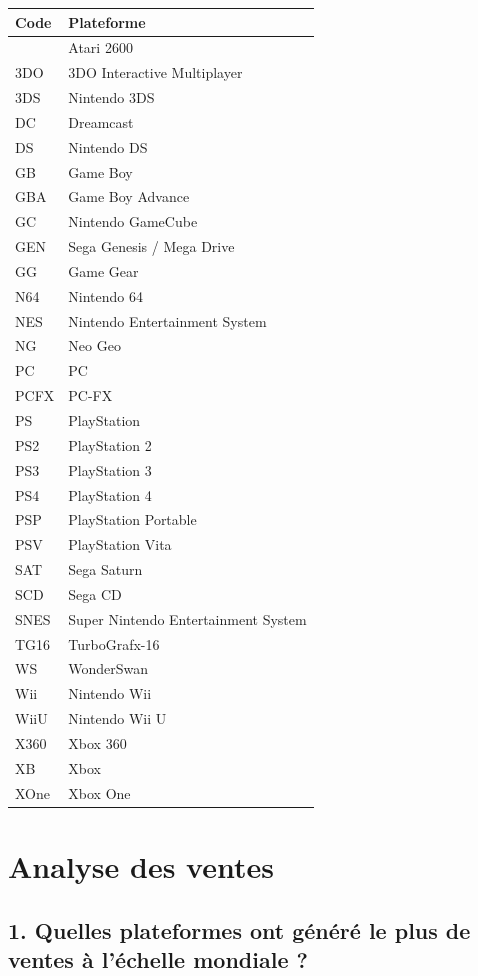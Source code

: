 \documentclass[
]{article}
\begin{document}
\begin{longtable}[]{@{}ll@{}}
\toprule\noalign{}
Code & Plateforme \\
\midrule\noalign{}
\endhead
\bottomrule\noalign{}
\endlastfoot
2600 & Atari 2600 \\
3DO & 3DO Interactive Multiplayer \\
3DS & Nintendo 3DS \\
DC & Dreamcast \\
DS & Nintendo DS \\
GB & Game Boy \\
GBA & Game Boy Advance \\
GC & Nintendo GameCube \\
GEN & Sega Genesis / Mega Drive \\
GG & Game Gear \\
N64 & Nintendo 64 \\
NES & Nintendo Entertainment System \\
NG & Neo Geo \\
PC & PC \\
PCFX & PC-FX \\
PS & PlayStation \\
PS2 & PlayStation 2 \\
PS3 & PlayStation 3 \\
PS4 & PlayStation 4 \\
PSP & PlayStation Portable \\
PSV & PlayStation Vita \\
SAT & Sega Saturn \\
SCD & Sega CD \\
SNES & Super Nintendo Entertainment System \\
TG16 & TurboGrafx-16 \\
WS & WonderSwan \\
Wii & Nintendo Wii \\
WiiU & Nintendo Wii U \\
X360 & Xbox 360 \\
XB & Xbox \\
XOne & Xbox One \\
\end{longtable}

\newpage

\section{Analyse des ventes}\label{analyse-des-ventes}

\subsection{1. Quelles plateformes ont généré le plus de ventes à
l'échelle mondiale
?}\label{quelles-plateformes-ont-guxe9nuxe9ruxe9-le-plus-de-ventes-uxe0-luxe9chelle-mondiale}
\end{document}
